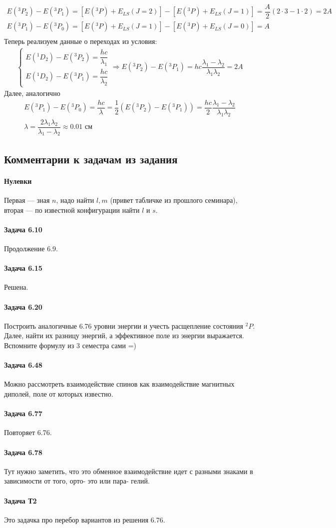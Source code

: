 \documentclass[12pt]{article}
\begin{document}
\begin{gather*}
    E(^3P_2) - E(^3P_1) = [E(^3P)+E_{LS}(J=2)] - [E(^3P)+E_{LS}(J=1)] = \dfrac{A}{2}(2\cdot 3 - 1\cdot2)= 2A\\
    E(^3P_1) - E(^3P_0) = [E(^3P)+E_{LS}(J=1)] - [E(^3P)+E_{LS}(J=0)] = A\\
\end{gather*}
Теперь реализуем данные о переходах из условия:
\begin{gather*}
\begin{cases}
    E(^1D_2) - E(^3P_2) = \dfrac{hc}{\lambda_1}\\
    E(^1D_2) - E(^3P_1) = \dfrac{hc}{\lambda_2}
\end{cases}
\Rightarrow E(^3P_2) - E(^3P_1)= hc \dfrac{\lambda_1-\lambda_2}{\lambda_1\lambda_2} =2A
\end{gather*}
Далее, аналогично 
\begin{gather*}
E(^3P_1) - E(^3P_0) = \dfrac{hc}{\lambda} = \dfrac{1}{2}(E(^3P_2) - E(^3P_1))= \dfrac{hc}{2} \dfrac{\lambda_1-\lambda_2}{\lambda_1\lambda_2}\\
\lambda = \dfrac{2\lambda_1\lambda_2}{\lambda_1-\lambda_2} \approx 0.01 \text{ см}
\end{gather*}

\subsection{Комментарии к задачам из задания}
\paragraph{Нулевки}  Первая --- зная $n$, надо найти $l, m$ (привет табличке из прошлого семинара), вторая --- по известной конфигурации найти $l$ и $s$.
\paragraph{Задача 6.10} Продолжение 6.9.
\paragraph{Задача 6.15} Решена.
\paragraph{Задача 6.20} Построить аналогичные 6.76 уровни энергии и учесть расщепление состояния $^2P$. Далее, найти их разницу энергий, а эффективное поле из энергии выражается. Вспомните формулу из 3 семестра сами =)
\paragraph{Задача 6.48} Можно рассмотреть взаимодействие спинов как взаимодействие магнитных диполей, поле от которых известно.
\paragraph{Задача 6.77} Повторяет 6.76.
\paragraph{Задача 6.78} Тут нужно заметить, что это обменное взаимодействие идет с разными знаками в зависимости от того, орто- это или пара- гелий.
\paragraph{Задача Т2} Это задачка про перебор вариантов из решения 6.76.
\end{document}
